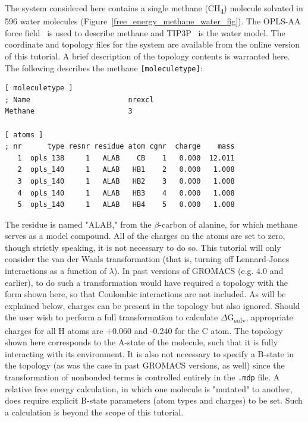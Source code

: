 \documentclass[9pt,tutorial,pubversion]{livecoms}
\begin{document}
The system considered here contains a single methane (CH\textsubscript4) molecule solvated in 596 water molecules (Figure~\ref{free_energy_methane_water_fig}). The OPLS-AA force field~\cite{Kaminski2001} is used to describe methane and TIP3P~\cite{Jorgensen1983} is the water model. The coordinate and topology files for the system are available from the online version of this tutorial. A brief description of the topology contents is warranted here. The following describes the methane \texttt{[moleculetype]}:

\begin{lstlisting}[basicstyle=\footnotesize\ttfamily]
[ moleculetype ]
; Name                       nrexcl
Methane                      3

[ atoms ]
; nr      type resnr residue atom cgnr  charge    mass
   1  opls_138     1   ALAB    CB    1   0.000  12.011   
   2  opls_140     1   ALAB   HB1    2   0.000   1.008   
   3  opls_140     1   ALAB   HB2    3   0.000   1.008   
   4  opls_140     1   ALAB   HB3    4   0.000   1.008   
   5  opls_140     1   ALAB   HB4    5   0.000   1.008
\end{lstlisting}

The residue is named "ALAB," from the $\beta$-carbon of alanine, for which methane serves as a model compound. All of the charges on the atoms are set to zero, though strictly speaking, it is not necessary to do so. This tutorial will only consider the van der Waals transformation (that is, turning off Lennard-Jones interactions as a function of $\lambda$). In past versions of GROMACS (e.g. 4.0 and earlier), to do such a transformation would have required a topology with the form shown here, so that Coulombic interactions are not included. As will be explained below, charges can be present in the topology but also ignored. Should the user wish to perform a full transformation to calculate $\Delta$G\textsubscript{solv}, appropriate charges for all H atoms are +0.060 and -0.240 for the C atom. The topology shown here corresponds to the A-state of the molecule, such that it is fully interacting with its environment. It is also not necessary to specify a B-state in the topology (as was the case in past GROMACS versions, as well) since the transformation of nonbonded terms is controlled entirely in the \texttt{.mdp} file. A relative free energy calculation, in which one molecule is "mutated" to another, does require explicit B-state parameters (atom types and charges) to be set. Such a calculation is beyond the scope of this tutorial.
\end{document}
